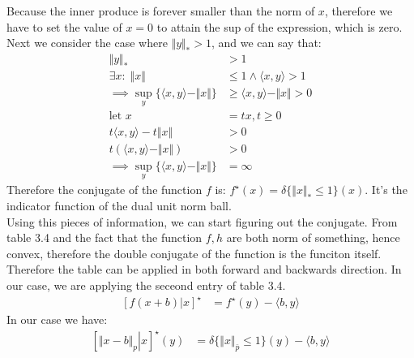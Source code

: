 \documentclass[]{article}
\begin{document}
        Because the inner produce is forever smaller than the norm of $x$, therefore we have to set the value of $x = 0$ to attain the sup of the expression, which is zero. 
        \\[1.1em]
        Next we consider the case where $\Vert y\Vert_* > 1$, and we can say that: 
        \begin{align*}\tag{4.2.2.3}\label{eqn:4.2.2.3}
            \Vert y\Vert_* & > 1
            \\
            \exists x: \; \Vert x\Vert &\le 1 \wedge \langle x, y\rangle > 1 
            \\
            \implies 
            \sup_y \{\langle x, y \rangle   - \Vert x\Vert\} &\ge 
            \langle x, y \rangle - \Vert x\Vert > 0 
            \\
            \text{let } x &= tx, t \ge 0 
            \\
            t \langle x, y \rangle - t \Vert  x\Vert &> 0 
            \\
            t(\langle x, y \rangle - \Vert x\Vert) &> 0
            \\
            \implies \sup_y \{\langle x, y \rangle - \Vert x\Vert\} &= \infty
        \end{align*}
        Therefore the conjugate of the function $f$ is: $f^\star(x) = \delta \{\Vert x\Vert_* \le 1\}(x)$. It's the indicator function of the dual unit norm ball. 
        \\[1.1em]
        Using this pieces of information, we can start figuring out the conjugate. From table 3.4 and the fact that the function $f, h$  are both norm of something, hence convex, therefore the double conjugate of the function is the funciton itself. Therefore the table can be applied in both forward and backwards direction. In our case, we are applying the seceond entry of table 3.4. 
        \begin{align*}\tag{4.2.2.4}\label{eqn:4.2.2.4}
            \left[
                \left . f(x + b) \right| x
            \right]^\star &= 
            f^\star(y) - \langle b, y\rangle
        \end{align*}
        In our case we have: 
        \begin{align*}\tag{4.2.2.5}\label{eqn:4.2.2.5}
            \left[
                \left. \Vert x - b\Vert_p 
                \right| 
                x
            \right]^\star (y) 
            &= 
            \delta \{\Vert x\Vert_{\bar{p}} \le 1\}(y)  - \langle b, y \rangle
        \end{align*} 
\end{document}
